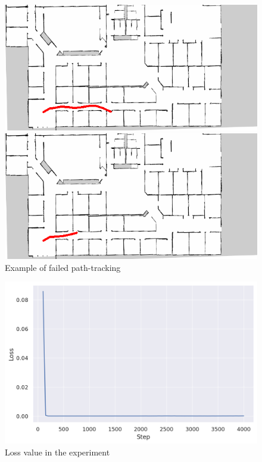 \begin{figure}[h]
  \begin{minipage}[b]{0.45\linewidth}
    \centering
    \includegraphics[keepaspectratio, scale=0.35]{images/694_520_0128/traject9.png}
    \subcaption{}
  \end{minipage}
  \begin{minipage}[b]{0.45\linewidth}
    \centering
    \includegraphics[keepaspectratio, scale=0.35]{images/694_520_0128/traject22.png}
    \subcaption{}
  \end{minipage}
\caption{Example of failed path-tracking}
\label{Fig:fail}
\end{figure}

\newpage
\begin{figure}[h]
  \centering
  \includegraphics[keepaspectratio, scale=0.6]{images/694_520_9.png}
  \caption{Loss value in the experiment}
  \label{Fig:sample}
\end{figure}

